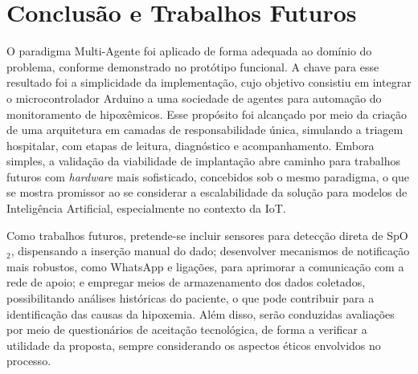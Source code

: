 \section{Conclusão e Trabalhos Futuros}
O paradigma Multi-Agente foi aplicado de forma adequada ao domínio do problema, conforme demonstrado no protótipo funcional. A chave para esse resultado foi a simplicidade da implementação, cujo objetivo consistiu em integrar o microcontrolador Arduino a uma sociedade de agentes para automação do monitoramento de hipoxêmicos. Esse propósito foi alcançado por meio da criação de uma arquitetura em camadas de responsabilidade única, simulando a triagem hospitalar, com etapas de leitura, diagnóstico e acompanhamento. Embora simples, a validação da viabilidade de implantação abre caminho para trabalhos futuros com \textit{hardware} mais sofisticado, concebidos sob o mesmo paradigma, o que se mostra promissor ao se considerar a escalabilidade da solução para modelos de Inteligência Artificial, especialmente no contexto da IoT.

Como trabalhos futuros, pretende-se incluir sensores para detecção direta de SpO$_2$, dispensando a inserção manual do dado; desenvolver mecanismos de notificação mais robustos, como WhatsApp e ligações, para aprimorar a comunicação com a rede de apoio; e empregar meios de armazenamento dos dados coletados, possibilitando análises históricas do paciente, o que pode contribuir para a identificação das causas da hipoxemia. Além disso, serão conduzidas avaliações por meio de questionários de aceitação tecnológica, de forma a verificar a utilidade da proposta, sempre considerando os aspectos éticos envolvidos no processo.
